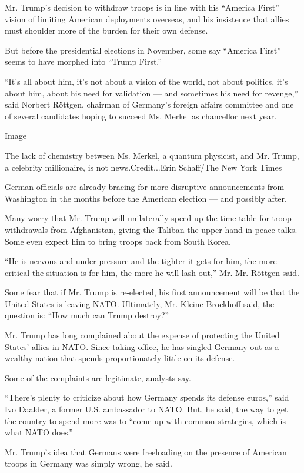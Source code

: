 Mr. Trump's decision to withdraw troops is in line with his ``America
First'' vision of limiting American deployments overseas, and his
insistence that allies must shoulder more of the burden for their own
defense.

But before the presidential elections in November, some say ``America
First'' seems to have morphed into ``Trump First.''

``It's all about him, it's not about a vision of the world, not about
politics, it's about him, about his need for validation --- and
sometimes his need for revenge,'' said Norbert Röttgen, chairman of
Germany's foreign affairs committee and one of several candidates hoping
to succeed Ms. Merkel as chancellor next year.

Image

The lack of chemistry between Ms. Merkel, a quantum physicist, and Mr.
Trump, a celebrity millionaire, is not news.Credit...Erin Schaff/The New
York Times

German officials are already bracing for more disruptive announcements
from Washington in the months before the American election --- and
possibly after.

Many worry that Mr. Trump will unilaterally speed up the time table for
troop withdrawals from Afghanistan, giving the Taliban the upper hand in
peace talks. Some even expect him to bring troops back from South Korea.

``He is nervous and under pressure and the tighter it gets for him, the
more critical the situation is for him, the more he will lash out,'' Mr.
Mr. Röttgen said.

Some fear that if Mr. Trump is re-elected, his first announcement will
be that the United States is leaving NATO. Ultimately, Mr.
Kleine-Brockhoff said, the question is: ``How much can Trump destroy?''

Mr. Trump has long complained about the expense of protecting the United
States' allies in NATO. Since taking office, he has singled Germany out
as a wealthy nation that spends proportionately little on its defense.

Some of the complaints are legitimate, analysts say.

``There's plenty to criticize about how Germany spends its defense
euros,'' said Ivo Daalder, a former U.S. ambassador to NATO. But, he
said, the way to get the country to spend more was to ``come up with
common strategies, which is what NATO does.''

Mr. Trump's idea that Germans were freeloading on the presence of
American troops in Germany was simply wrong, he said.

